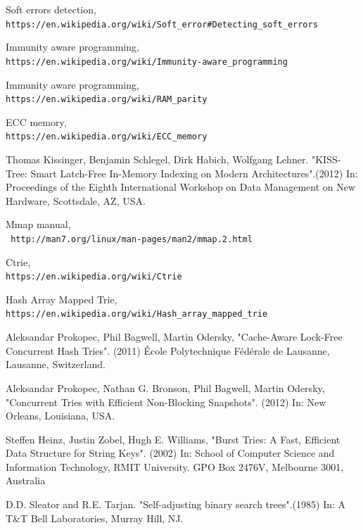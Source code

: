 \documentclass{report}
\begin{document}
\begin{thebibliography}{1}
Soft errors detection,\\\texttt{https://en.wikipedia.org/wiki/Soft_error#Detecting_soft_errors}

Immunity aware programming,\\\texttt{https://en.wikipedia.org/wiki/Immunity-aware_programming}


Immunity aware programming,\\\texttt{https://en.wikipedia.org/wiki/RAM_parity}

ECC memory,\\\texttt{https://en.wikipedia.org/wiki/ECC_memory}

Thomas Kissinger, Benjamin Schlegel, Dirk Habich, Wolfgang Lehner. "KISS-Tree: Smart Latch-Free In-Memory Indexing on Modern Architectures".(2012) In: Proceedings of the Eighth International Workshop on Data Management on New Hardware, Scottsdale, AZ, USA.
 
Mmap manual,\\\texttt{ http://man7.org/linux/man-pages/man2/mmap.2.html}

Ctrie,\\\texttt{https://en.wikipedia.org/wiki/Ctrie}

Hash Array Mapped Trie, \\\texttt{https://en.wikipedia.org/wiki/Hash_array_mapped_trie}

Aleksandar Prokopec, Phil Bagwell, Martin Odersky, "Cache-Aware Lock-Free Concurrent Hash Tries". (2011) École Polytechnique Fédérale de Lausanne, Lausanne, Switzerland.

Aleksandar Prokopec, Nathan G. Bronson, Phil Bagwell, Martin Odersky, "Concurrent Tries with Efficient Non-Blocking Snapshots". (2012) In: New Orleans, Louisiana, USA.

Steffen Heinz, Justin Zobel, Hugh E. Williams, "Burst Tries: A Fast, Efficient Data Structure for String Keys". (2002) In: School of Computer Science and Information Technology, RMIT University.
GPO Box 2476V, Melbourne 3001, Australia

 D.D. Sleator and R.E. Tarjan. "Self-adjusting binary search trees".(1985) In: A T&T Bell Laboratories, Murray Hill, NJ. 

\end{thebibliography}
\end{document}
